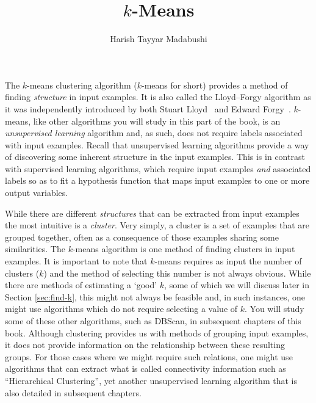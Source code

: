 \title{$k$-Means}
\label{chp:k-means}
\author{Harish Tayyar Madabushi}
\maketitle

The $k$-means clustering algorithm ($k$-means for short) provides a method of finding \emph{structure} in input examples. It is also called the Lloyd--Forgy algorithm as it was independently introduced by both Stuart Lloyd~\cite{lloyd1982least} and Edward Forgy~\cite{Forgy1965ClusterAO}. $k$-means, like other algorithms you will study in this part of the book, is an \emph{unsupervised learning} algorithm and, as such, does not require labels associated with input examples. Recall that unsupervised learning algorithms provide a way of discovering some inherent structure in the input examples. This is in contrast with supervised learning algorithms, which require input examples \emph{and} associated labels so as to fit a hypothesis function that maps input examples to one or more output variables. 

While there are different \emph{structures} that can be extracted from input examples the most intuitive is a \emph{cluster}. Very simply, a cluster is a set of examples that are grouped together, often as a consequence of those examples sharing some similarities. The $k$-means algorithm is one method of finding clusters in input examples. It is important to note that $k$-means requires as input the number of clusters ($k$) and the method of selecting this number is not always obvious. While there are methods of estimating a `good' $k$, some of which we will discuss later in Section \ref{sec:find-k}, this might not always be feasible and, in such instances, one might use algorithms which do not require selecting a value of $k$. You will study some of these other algorithms, such as DBScan, in subsequent chapters of this book. Although clustering provides us with methods of grouping input examples, it does not provide information on the relationship between these resulting groups. For those cases where we might require such relations, one might use algorithms that can extract what is called connectivity information such as  ``Hierarchical Clustering'', yet another unsupervised learning algorithm that is also detailed in subsequent chapters.

